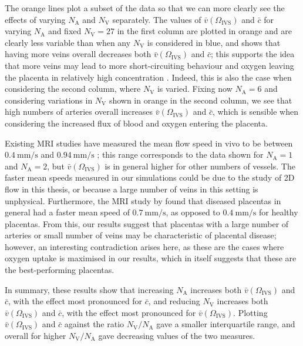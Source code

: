             The orange lines plot a subset of the data so that we can more clearly see the effects of varying $N_\text{A}$ and $N_\text{V}$ separately. The values of $\bar{v}(\Omega_\text{IVS})$ and $\bar{c}$ for varying $N_\text{A}$ and fixed $N_\text{V} = 27$ in the first column are plotted in orange and are clearly less variable than when any $N_\text{V}$ is considered in blue, and shows that having more veins overall decreases both $\bar{v}(\Omega_\text{IVS})$ and $\bar{c}$; this supports the idea that more veins may lead to more short-circuiting behaviour and oxygen leaving the placenta in relatively high concentration \cite{erianMaternalPlacentalBlood1977,chernyavskyMathematicalModelIntervillous2010}. Indeed, this is also the case when considering the second column, where $N_\text{V}$ is varied. Fixing now $N_\text{A} = 6$ and considering variations in $N_\text{V}$ shown in orange in the second column, we see that high numbers of arteries overall increases $\bar{v}(\Omega_\text{IVS})$ and $\bar{c}$, which is sensible when considering the increased flux of blood and oxygen entering the placenta.

            Existing MRI studies have measured the mean flow speed in vivo to be between $\qty{0.4}{\milli\metre\per\second}$ and $\qty{0.94}{\milli\metre\per\second}$ \cite{lecarpentierComputationalFluidDynamic2016,dellschaftHaemodynamicsHumanPlacenta2020,serovOptimalVilliDensity2015}; this range corresponds to the data shown for $N_\text{A} = 1$ and $N_\text{A} = 2$, but $\bar{v}(\Omega_\text{IVS})$ is in general higher for other numbers of vessels. The faster mean speeds measured in our simulations could be due to the study of 2D flow in this thesis, or because a large number of veins in this setting is unphysical. Furthermore, the MRI study by \citeauthor{dellschaftHaemodynamicsHumanPlacenta2020} \cite{dellschaftHaemodynamicsHumanPlacenta2020} found that diseased placentas in general had a faster mean speed of $\qty{0.7}{\milli\metre\per\second}$, as opposed to $\qty{0.4}{\milli\metre\per\second}$ for healthy placentas. From this, our results suggest that placentas with a large number of arteries or small number of veins may be characteristic of placental disease; however, an interesting contradiction arises here, as these are the cases where oxygen uptake is maximised in our results, which in itself suggests that these are the best-performing placentas.

            In summary, these results show that increasing $N_\text{A}$ increases both $\bar{v}(\Omega_\text{IVS})$ and $\bar{c}$, with the effect most pronounced for $\bar{c}$, and reducing $N_\text{V}$ increases both $\bar{v}(\Omega_\text{IVS})$ and $\bar{c}$, with the effect most pronounced for $\bar{v}(\Omega_\text{IVS})$. Plotting $\bar{v}(\Omega_\text{IVS})$ and $\bar{c}$ against the ratio $N_\text{V}/N_\text{A}$ gave a smaller interquartile range, and overall for higher $N_\text{V}/N_\text{A}$ gave decreasing values of the two measures.

